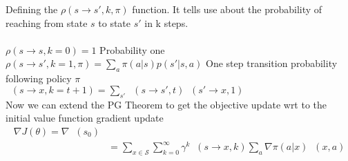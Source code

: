 \documentclass{article}
\DeclareMathOperator{\qp}{q_\pi} %
\DeclareMathOperator{\vp}{v_\pi} %
\DeclareMathOperator{\rhp}{\rho_{\pi}} %
\begin{document}
Defining the $\rho(s \rightarrow s',k, \pi)$ function. It tells use about the probability of reaching from state $s$ to state $s'$ in k steps.\\
\\
$\rho(s \rightarrow s, k= 0) = 1$ Probability one\\
$\rho(s \rightarrow s', k = 1, \pi) = \sum_a \pi(a|s) p(s'|s,a)$ One step transition probability following policy $\pi$\\

$\rhp(s \rightarrow x , k = t+1) = \sum_{s'}\rhp(s \rightarrow s', t)\rhp(s' \rightarrow x, 1)$\\
Now we can extend the PG Theorem to get the objective update wrt to the initial value function gradient update
\begin{align*}
    \nabla J(\theta) = \nabla \vp(s_0)\\
    &= \sum_{x \in \mathcal{S}}\sum_{k = 0}^{\infty} \gamma^k \rhp(s \rightarrow x, k) \sum_a \nabla \pi(a|x) \qp(x,a)\\
\end{align*}
\end{document}

